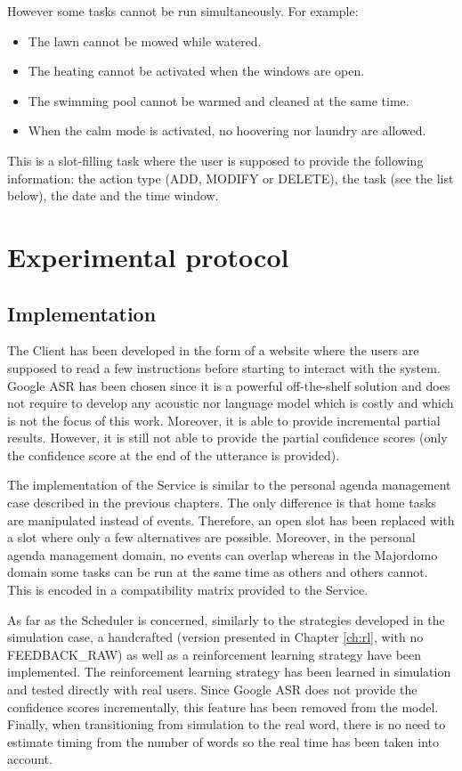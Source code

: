 	However some tasks cannot be run simultaneously. For example:
	
	\begin{itemize}
		\item The lawn cannot be mowed while watered.
		\item The heating cannot be activated when the windows are open.
		\item The swimming pool cannot be warmed and cleaned at the same time.
		\item When the calm mode is activated, no hoovering nor laundry are allowed.
	\end{itemize}
	
	This is a slot-filling task where the user is supposed to provide the following information: the action type (ADD, MODIFY or DELETE), the task (see the list below), the date and the time window.

\section{Experimental protocol}

	\subsection{Implementation}
	
		The Client has been developed in the form of a website where the users are supposed to read a few instructions before starting to interact with the system. Google ASR has been chosen since it is a powerful off-the-shelf solution and does not require to develop any acoustic nor language model which is costly and which is not the focus of this work. Moreover, it is able to provide incremental partial results. However, it is still not able to provide the partial confidence scores (only the confidence score at the end of the utterance is provided).
		
		The implementation of the Service is similar to the personal agenda management case described in the previous chapters. The only difference is that home tasks are manipulated instead of events. Therefore, an open slot has been replaced with a slot where only a few alternatives are possible. Moreover, in the personal agenda management domain, no events can overlap whereas in the Majordomo domain some tasks can be run at the same time as others and others cannot. This is encoded in a compatibility matrix provided to the Service.
		
		As far as the Scheduler is concerned, similarly to the strategies developed in the simulation case, a handcrafted (version presented in Chapter \ref{ch:rl}, with no FEEDBACK\_RAW) as well as a reinforcement learning strategy have been implemented. The reinforcement learning strategy has been learned in simulation and tested directly with real users. Since Google ASR does not provide the confidence scores incrementally, this feature has been removed from the model. Finally, when transitioning from simulation to the real word, there is no need to estimate timing from the number of words so the real time has been taken into account.
		
